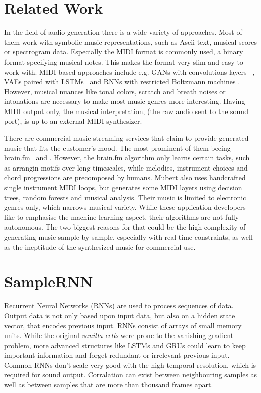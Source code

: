 \documentclass[12pt]{article}
\begin{document}
\section{Related Work}
In the field of audio generation there is a wide variety of approaches.
Most of them work with symbolic music representations, such as Ascii-text, musical scores or spectrogram data.
Especially the MIDI format is commonly used, a binary format specifying musical notes.
This makes the format very slim and easy to work with.
MIDI-based approaches include e.g. GANs with convolutions layers ~\cite{yang2017midinet, mogren2016c, mogren2016c}, VAEs paired with LSTMs~\cite{roberts2018hierarchical, tikhonov2017music, hennig2017classifying} and RNNs with restricted Boltzmann machines \cite{boulanger2012modeling}.
However, musical nuances like tonal colors, scratch and breath noises or intonations are necessary to make most music genres more interesting.
Having MIDI output only, the musical interpretation, (the raw audio sent to the sound port), is up to an external MIDI synthesizer.

There are commercial music streaming services that claim to provide generated music that fits the customer's mood.
The most prominent of them beeing brain.fm~\cite{brain.fm} and \cite{Mubert}.
However, the brain.fm algorithm only learns certain tasks, such as arrangin motifs over long timescales, while melodies, instrument choices and chord progressions are precomposed by humans.
Mubert also uses handcrafted single instrument MIDI loops, but generates some MIDI layers using decision trees, random forests and musical analysis.
Their music is limited to electronic genres only, which narrows musical variety.
While these application developers like to emphasise the machine learning aspect, their algorithms are not fully autonomous.
The two biggest reasons for that could be the high complexity of generating music sample by sample, especially with real time constraints, as well as the ineptitude of the synthesized music for commercial use.




\section{SampleRNN}
Recurrent Neural Networks (RNNs) are used to process sequences of data.
Output data is not only based upon input data, but also on a hidden state vector, that encodes previous input.
RNNs consist of arrays of small memory units.
While the original \emph{vanilla cells} were prone to the vanishing gradient problem, more advanced structures like LSTMs and GRUs could learn to keep important information and forget redundant or irrelevant previous input.
Common RNNs don't scale very good with the high temporal resolution, which is required for sound output.
Corralation can exist between neighbouring samples as well as between samples that are more than thousand frames apart.
\end{document}
